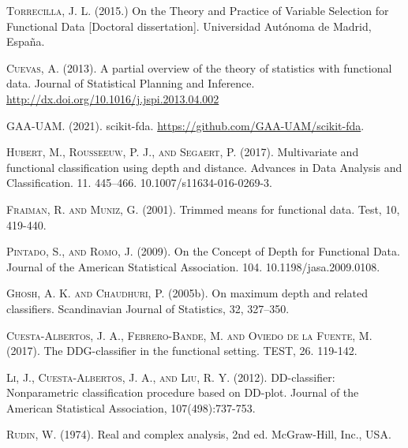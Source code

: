 \documentclass[a4paper,oneside,11pt,leqno]{article}
\begin{document}
\begin{enumerate}
\begin{thebibliography}{10}
              \textsc{Torrecilla, J. L.} (2015.) On the Theory and Practice of Variable
              Selection for Functional Data [Doctoral dissertation]. Universidad Autónoma de Madrid, España.

              \textsc{Cuevas, A.} (2013). A partial overview of the theory of statistics with functional data.
              Journal of Statistical Planning and Inference. \url{http://dx.doi.org/10.1016/j.jspi.2013.04.002}

              \textsc{GAA-UAM.} (2021). scikit-fda. \url{https://github.com/GAA-UAM/scikit-fda}.

              \textsc{Hubert, M., Rousseeuw, P. J., and Segaert, P.} (2017).
              Multivariate and functional classification using depth and distance.
              Advances in Data Analysis and Classification. 11. 445–466. 10.1007/s11634-016-0269-3.

              \textsc{Fraiman, R. and Muniz, G.} (2001). Trimmed means for functional
              data. Test, 10, 419-440.

              \textsc{Pintado, S., and Romo, J.} (2009). On the Concept of Depth for Functional Data.
              Journal of the American Statistical Association. 104. 10.1198/jasa.2009.0108.

              \textsc{Ghosh, A. K. and Chaudhuri, P.} (2005b). On maximum depth and
              related classifiers. Scandinavian Journal of Statistics, 32, 327–350.

              \textsc{Cuesta-Albertos, J. A., Febrero-Bande, M. and Oviedo de la Fuente, M.}
              (2017). The DDG-classifier in the functional setting. TEST, 26. 119-142.

              \textsc{Li, J., Cuesta-Albertos, J. A., and Liu, R. Y.} (2012).
              DD-classifier: Nonparametric classification procedure based on DD-plot.
              Journal of the American Statistical Association, 107(498):737-753.

              \textsc{Rudin, W.} (1974).
              Real and complex analysis, 2nd ed. McGraw-Hill, Inc., USA.

          \end{thebibliography}


\end{enumerate}
\end{document}
